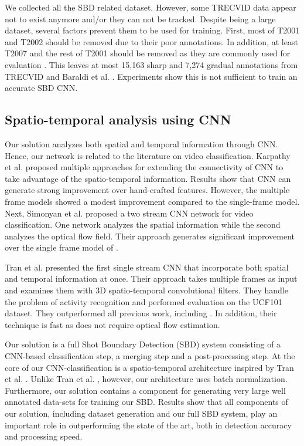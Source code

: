 \documentclass[journal]{IEEEtran}
\begin{document}
We collected all the SBD related dataset. However, some TRECVID data appear not to exist anymore and/or they can not be tracked. Despite being a large dataset, several factors prevent them to be used for training. First, most of T2001 and T2002 should be removed due to their poor annotations. In addition, at least T2007 and the rest of T2001 should be removed as they are commonly used for evaluation \cite{Priya14,Lu13,Liu07}. This leaves at most 15,163 sharp and 7,274 gradual annotations from TRECVID and Baraldi et al. \cite{Baraldi15}. Experiments show this is not sufficient to train an accurate SBD CNN. 

\subsection{Spatio-temporal analysis using CNN} 



Our solution analyzes both spatial and temporal information through CNN. Hence, our network is related to the literature on video classification. Karpathy et al. \cite{Karpathy14} proposed multiple approaches for extending the connectivity of CNN to take advantage of the spatio-temporal information. Results show that CNN can generate strong improvement over hand-crafted features. However, the multiple frame models showed a modest improvement compared to the single-frame model. Next, Simonyan et al. \cite{Simonyan14} proposed a two stream CNN network for video classification. One network analyzes the spatial information while the second analyzes the optical flow field. Their approach generates significant improvement over the single frame model of \cite{Karpathy14}.     

Tran et al. \cite{Tran15} presented the first single stream CNN that incorporate both spatial and temporal information at once. Their approach takes multiple frames as input and examines them with 3D spatio-temporal convolutional filters. They handle the problem of activity recognition and performed evaluation on the UCF101 dataset. They outperformed all previous work, including \cite{Karpathy14,Simonyan14}. In addition, their technique is fast as does not require optical flow estimation. 

Our solution is a full Shot Boundary Detection (SBD) system consisting of a CNN-based classification step, a merging step and a post-processing step. At the core of our CNN-classification is a spatio-temporal architecture inspired by Tran et al. \cite{Tran15}. Unlike Tran et al. \cite{Tran15}, however, our architecture uses batch normalization. Furthermore, our solution contains a component for generating very large well annotated data-sets for training our SBD. Results show that all components of our solution, including dataset generation and our full SBD system, play an important role in outperforming the state of the art, both in detection accuracy and processing speed.
\end{document}
